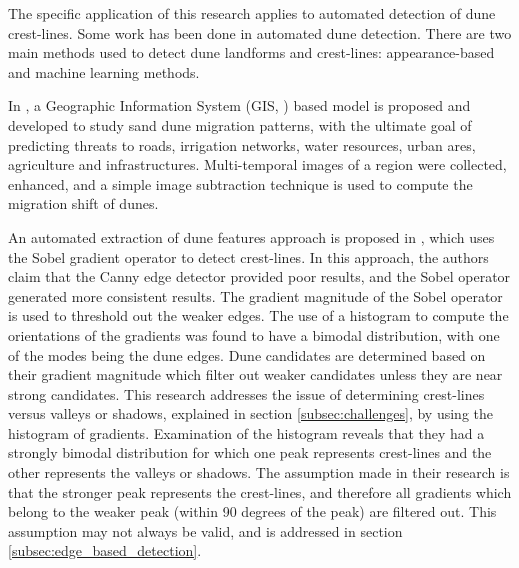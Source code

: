 The specific application of this research applies to automated detection of dune crest-lines. Some work has been done in automated dune detection. There are two main methods used to detect dune landforms and crest-lines: appearance-based and machine learning methods.

In \cite{2012_automated_extraction_sand_dunes_egypt}, a Geographic Information System (GIS, \cite{gis_article}) based model is proposed and developed to study sand dune migration patterns, with the ultimate goal of predicting threats to roads, irrigation networks, water resources, urban ares, agriculture and infrastructures. Multi-temporal images of a region were collected, enhanced, and a simple image subtraction technique is used to compute the migration shift of dunes.

An automated extraction of dune features approach is proposed in \cite{2015_automated_mapping_of_linear_dunefield}, which uses the Sobel gradient operator to detect crest-lines. In this approach, the authors claim that the Canny edge detector provided poor results, and the Sobel operator generated more consistent results. The gradient magnitude of the Sobel operator is used to threshold out the weaker edges. The use of a histogram to compute the orientations of the gradients was found to have a bimodal distribution, with one of the modes being the dune edges. Dune candidates are determined based on their gradient magnitude which filter out weaker candidates unless they are near strong candidates. This research addresses the issue of determining crest-lines versus valleys or shadows, explained in section \ref{subsec:challenges}, by using the histogram of gradients. Examination of the histogram reveals that they had a strongly bimodal distribution for which one peak represents crest-lines and the other represents the valleys or shadows. The assumption made in their research is that the stronger peak represents the crest-lines, and therefore all gradients which belong to the weaker peak (within 90 degrees of the peak) are filtered out. This assumption may not always be valid, and is addressed in section \ref{subsec:edge_based_detection}.

